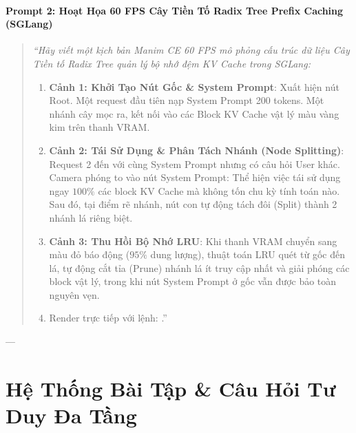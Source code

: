 \begin{simulationbox}
\paragraph{Prompt 2: Hoạt Họa 60 FPS Cây Tiền Tố Radix Tree Prefix Caching (SGLang)}
\begin{quote}\small\itshape
``Hãy viết một kịch bản Manim CE 60 FPS mô phỏng cấu trúc dữ liệu Cây Tiền tố Radix Tree quản lý bộ nhớ đệm KV Cache trong SGLang:
\begin{enumerate}
  \item \textbf{Cảnh 1: Khởi Tạo Nút Gốc \& System Prompt}: Xuất hiện nút Root. Một request đầu tiên nạp System Prompt 200 tokens. Một nhánh cây mọc ra, kết nối vào các Block KV Cache vật lý màu vàng kim trên thanh VRAM.
  \item \textbf{Cảnh 2: Tái Sử Dụng \& Phân Tách Nhánh (Node Splitting)}: Request 2 đến với cùng System Prompt nhưng có câu hỏi User khác. Camera phóng to vào nút System Prompt: Thể hiện việc tái sử dụng ngay $100\%$ các block KV Cache mà không tốn chu kỳ tính toán nào. Sau đó, tại điểm rẽ nhánh, nút con tự động tách đôi (Split) thành 2 nhánh lá riêng biệt.
  \item \textbf{Cảnh 3: Thu Hồi Bộ Nhớ LRU}: Khi thanh VRAM chuyển sang màu đỏ báo động ($95\%$ dung lượng), thuật toán LRU quét từ gốc đến lá, tự động cắt tỉa (Prune) nhánh lá ít truy cập nhất và giải phóng các block vật lý, trong khi nút System Prompt ở gốc vẫn được bảo toàn nguyên vẹn.
  \item Render trực tiếp với lệnh: .''
\end{enumerate}
\end{quote}
\end{simulationbox}

---

\section{Hệ Thống Bài Tập \& Câu Hỏi Tư Duy Đa Tầng}
\label{sec:ch07-exercises}


